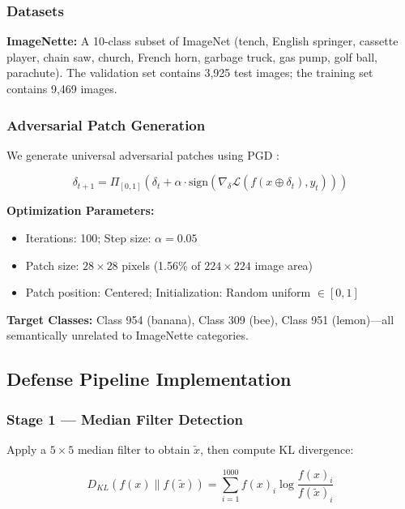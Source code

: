 \documentclass[conference]{IEEEtran}
\begin{document}
\subsubsection{Datasets}

\textbf{ImageNette:} A 10-class subset of ImageNet (tench, English springer, cassette player, chain saw, church, French horn, garbage truck, gas pump, golf ball, parachute). The validation set contains 3,925 test images; the training set contains 9,469 images.

\subsubsection{Adversarial Patch Generation}

We generate universal adversarial patches using PGD \cite{madry2018towards}:

\begin{equation}
\delta_{t+1} = \Pi_{[0,1]} \left( \delta_t + \alpha \cdot \text{sign}\left(\nabla_\delta \mathcal{L}(f(x \oplus \delta_t), y_t)\right) \right)
\end{equation}

\textbf{Optimization Parameters:}
\begin{itemize}
\item Iterations: 100; Step size: $\alpha = 0.05$
\item Patch size: $28\times28$ pixels (1.56\% of $224\times224$ image area)
\item Patch position: Centered; Initialization: Random uniform $\in [0,1]$
\end{itemize}

\textbf{Target Classes:} Class 954 (banana), Class 309 (bee), Class 951 (lemon)---all semantically unrelated to ImageNette categories.

\subsection{Defense Pipeline Implementation}

\subsubsection{Stage 1 --- Median Filter Detection}

Apply a $5\times5$ median filter to obtain $\tilde{x}$, then compute KL divergence:

\begin{equation}
D_{KL}(f(x) \| f(\tilde{x})) = \sum_{i=1}^{1000} f(x)_i \log\frac{f(x)_i}{f(\tilde{x})_i}
\end{equation}
\end{document}
